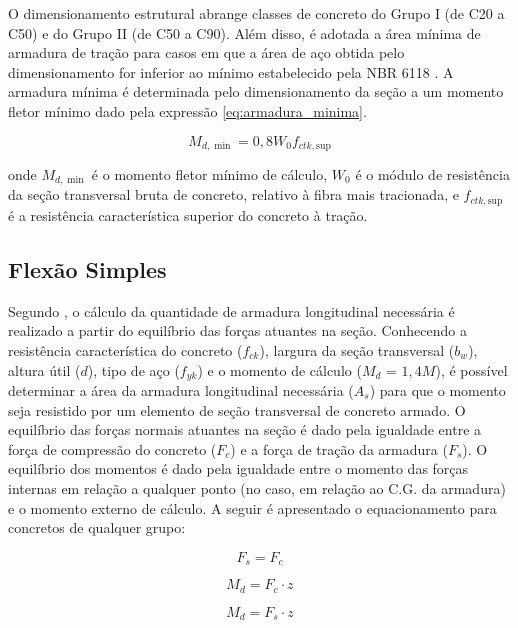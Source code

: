 O dimensionamento estrutural abrange classes de concreto do Grupo I (de C20 a C50) e do Grupo II (de C50 a C90). Além disso, é adotada a área mínima de armadura de tração para casos em que a área de aço obtida pelo dimensionamento for inferior ao mínimo estabelecido pela NBR 6118 . A armadura mínima é determinada pelo dimensionamento da seção a um momento fletor mínimo dado pela expressão \ref{eq:armadura_minima}.

\begin{equation}
M_{d,\min} = 0,8W_0f_{ctk,\mathrm{sup}}
\label{eq:armadura_minima}
\end{equation}

onde $M_{d,\min}$ é o momento fletor mínimo de cálculo, $W_0$ é o módulo de resistência da seção transversal bruta de concreto, relativo à fibra mais tracionada, e $f_{ctk,\mathrm{sup}}$ é a resistência característica superior do concreto à tração.

\subsection{Flexão Simples}

Segundo , o cálculo da quantidade de armadura longitudinal necessária é realizado a partir do equilíbrio das forças atuantes na seção. Conhecendo a resistência característica do concreto ($f_{ck}$), largura da seção transversal ($b_{w}$), altura útil ($d$), tipo de aço ($f_{yk}$) e o momento de cálculo ($M_{d}$ = $1,4M$), é possível
determinar a área da armadura longitudinal necessária ($A_{s}$) para que o momento seja resistido por um elemento de seção transversal de concreto armado. O equilíbrio das forças normais atuantes na seção é dado pela igualdade entre a força de compressão do concreto ($F_{c}$) e a força de tração da armadura ($F_{s}$). O equilíbrio dos momentos é dado pela igualdade entre o momento das forças internas em relação a qualquer ponto (no caso, em relação ao C.G. da armadura) e o momento externo de cálculo. A seguir é apresentado o equacionamento para concretos de qualquer grupo:

\begin{equation}
    F_s = F_c
\end{equation}

\begin{equation}
    M_d = F_c \cdot z
\end{equation}

\begin{equation}
    M_d = F_s \cdot z
\end{equation}

